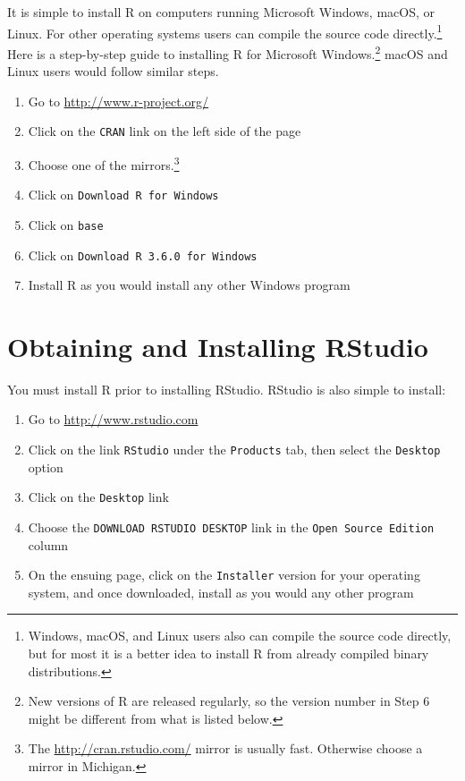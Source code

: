 \documentclass[]{krantz}
\providecommand{\tightlist}{%
  \setlength{\itemsep}{0pt}\setlength{\parskip}{0pt}}
\begin{document}
It is simple to install R on computers running Microsoft Windows, macOS,
or Linux. For other operating systems users can compile the source code
directly.\footnote{Windows, macOS, and Linux users also can compile the
  source code directly, but for most it is a better idea to install R
  from already compiled binary distributions.} Here is a step-by-step
guide to installing R for Microsoft Windows.\footnote{New versions of R
  are released regularly, so the version number in Step 6 might be
  different from what is listed below.} macOS and Linux users would
follow similar steps.

\begin{enumerate}
\def\labelenumi{\arabic{enumi}.}
\tightlist
\item
  Go to \url{http://www.r-project.org/}
\item
  Click on the \texttt{CRAN} link on the left side of the page
\item
  Choose one of the mirrors.\footnote{The \url{http://cran.rstudio.com/}
    mirror is usually fast. Otherwise choose a mirror in Michigan.}
\item
  Click on \texttt{Download\ R\ for\ Windows}
\item
  Click on \texttt{base}
\item
  Click on \texttt{Download\ R\ 3.6.0\ for\ Windows}
\item
  Install R as you would install any other Windows program
\end{enumerate}

\section{Obtaining and Installing
RStudio}\label{obtaining-and-installing-rstudio}

You must install R prior to installing RStudio. RStudio is also simple
to install:

\begin{enumerate}
\def\labelenumi{\arabic{enumi}.}
\tightlist
\item
  Go to \url{http://www.rstudio.com}
\item
  Click on the link \texttt{RStudio} under the \texttt{Products} tab,
  then select the \texttt{Desktop} option
\item
  Click on the \texttt{Desktop} link
\item
  Choose the \texttt{DOWNLOAD\ RSTUDIO\ DESKTOP} link in the
  \texttt{Open\ Source\ Edition} column
\item
  On the ensuing page, click on the \texttt{Installer} version for your
  operating system, and once downloaded, install as you would any other
  program
\end{enumerate}
\end{document}
